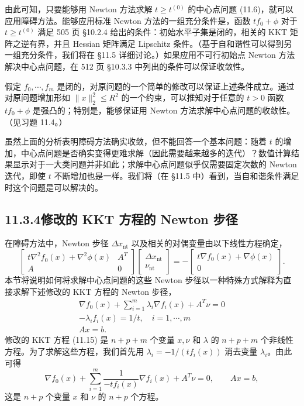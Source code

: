 \documentclass[UTF8, 12pt, fontset=fandol, oneside]{ctexart}
\begin{document}
由此可知，只要能够用 Newton 方法求解 $t\geq t^{(0)}$ 的中心点问题 (11.6)，就可以应用障碍方法。能够应用标准 Newton 方法的一组充分条件是，函数 $tf_0+\phi$ 对于 $t\geq t^{(0)}$ 满足 505 页 \S10.2.4 给出的条件：初始水平子集是闭的，相关的 KKT 矩阵之逆有界，并且 Hessian 矩阵满足 Lipschitz 条件。（基于自和谐性可以得到另一组充分条件，我们将在 \S11.5 详细讨论。）如果应用不可行初始点 Newton 方法解决中心点问题，在 512 页 \S10.3.3 中列出的条件可以保证收敛性。

假定 $f_0,\cdots,f_m$ 是闭的，对原问题的一个简单的修改可以保证上述条件成立。通过对原问题增加形如 $\|x\|_2^2\leq R^2$ 的一个约束，可以推知对于任意的 $t>0$ 函数 $tf_0+\phi$ 是强凸的；特别是，能够保证用 Newton 方法求解中心点问题的收敛性。（见习题 11.4。）

虽然上面的分析表明障碍方法确实收敛，但不能回答一个基本问题：随着 $t$ 的增加，中心点问题是否确实变得更难求解（因此需要越来越多的迭代）？数值计算结果显示对于一大类问题并非如此；求解中心点问题似乎仅需要固定次数的 Newton 迭代，即使 $t$ 不断增加也是一样。我们将（在 \S11.5 中）看到，当自和谐条件满足时这个问题是可以解决的。

\subsection*{11.3.4\quad 修改的 KKT 方程的 Newton 步径}

在障碍方法中，Newton 步径 $\Delta x_{\mathrm{nt}}$ 以及相关的对偶变量由以下线性方程确定，
\begin{equation}
\begin{bmatrix}
t\nabla^2 f_0(x)+\nabla^2\phi(x) & A^T\\
A & 0
\end{bmatrix}
\begin{bmatrix}
\Delta x_{\mathrm{nt}}\\
\nu_{\mathrm{nt}}
\end{bmatrix}
=-
\begin{bmatrix}
t\nabla f_0(x)+\nabla\phi(x)\\
0
\end{bmatrix}.
\tag{11.14}
\end{equation}
本节将说明如何将求解中心点问题的这些 Newton 步径以一种特殊方式解释为直接求解下述修改的 KKT 方程的 Newton 步径，
\begin{equation}
\begin{gathered}
\nabla f_0(x)+\sum_{i=1}^m \lambda_i\nabla f_i(x)+A^T\nu=0\\
-\lambda_i f_i(x)=1/t,\quad i=1,\cdots,m\\
Ax=b.
\end{gathered}
\tag{11.15}
\end{equation}
修改的 KKT 方程 (11.15) 是 $n+p+m$ 个变量 $x,\nu$ 和 $\lambda$ 的 $n+p+m$ 个非线性方程。为了求解这些方程，我们首先用 $\lambda_i=-1/(tf_i(x))$ 消去变量 $\lambda_i$。由此可得
\begin{equation}
\nabla f_0(x)+\sum_{i=1}^m\frac{1}{-tf_i(x)}\nabla f_i(x)+A^T\nu=0,\qquad Ax=b,
\tag{11.16}
\end{equation}
这是 $n+p$ 个变量 $x$ 和 $\nu$ 的 $n+p$ 个方程。
\end{document}
